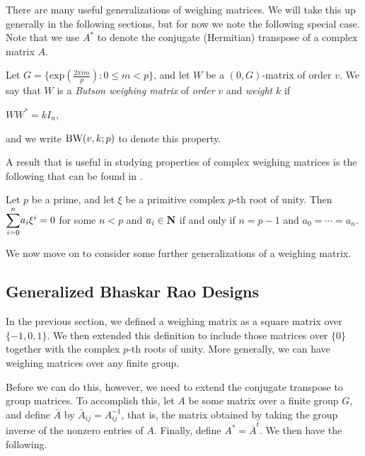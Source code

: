 \documentclass[../../../main]{subfiles}
\begin{document}
There are many useful generalizations of weighing matrices. We will take this up
generally in the following sections, but for now we note the following special
case. Note that we use $A^*$ to denote the conjugate (Hermitian) transpose of a complex matrix $A$.

\begin{defin}\label{butson-unitary}
  Let $G = \{\mathrm{exp}(\frac{2\pi im}{p}) : 0 \leq m < p\}$, and let $W$ be a $(0,G)$-matrix of order $v$. We say that $W$ is a {\it Butson weighing matrix} of {\it order} $v$ and {\it weight} $k$ if
  \begin{defenum}
  \item $WW^* = kI_n$,
  \end{defenum}
  and we write $\text{BW}(v,k;p)$ to denote this property.
\end{defin}

A result that is useful in studying properties of complex weighing matrices is
the following that can be found in \cite{lam-leung}.

\begin{lem}\label{butson lemma}
  Let $p$ be a prime, and let $\xi$ be a primitive complex $p$-th root of unity. Then $\ssum_{i=0}^n a_i\xi^i = 0$ for some $n < p$ and $a_i \in \mathbf{N}$ if and only if $n = p-1$ and $a_0 = \cdots = a_n$.
\end{lem}

We now move on to consider some further generalizations of a weighing matrix.

\dinkus


\subsection{Generalized Bhaskar Rao Designs}

In the previous section, we defined a weighing matrix as a square matrix over $\{-1,0,1\}$. We then extended this definition to include those matrices over $\{0\}$ together with the complex $p$-th roots of unity. More generally, we can have weighing matrices over any finite group. 

Before we can do this, however, we need to extend the conjugate transpose to group matrices. To accomplish this, let $A$ be some matrix over a finite group $G$, and define $\bar A$ by $\bar{A}_{ij}=A_{ij}^{-1}$, that is, the matrix obtained by taking the group inverse of the nonzero entries of $A$. Finally, define $A^* = \bar{A}^t$. We then have the following.
\end{document}
